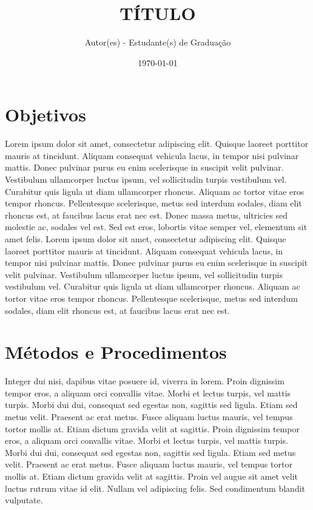 \documentclass[twocolumn]{article}
\title{TÍTULO}
\author{Autor(es) - Estudante(s) de Graduação}
\date{\today}
\begin{document}
\maketitle\thispagestyle{headings}

\section*{Objetivos}

Lorem ipsum dolor sit amet, consectetur adipiscing elit. Quisque laoreet porttitor mauris at tincidunt. Aliquam consequat vehicula lacus, in tempor nisi pulvinar mattis. Donec pulvinar purus eu enim scelerisque in suscipit velit pulvinar. Vestibulum ullamcorper luctus ipsum, vel sollicitudin turpis vestibulum vel. Curabitur quis ligula ut diam ullamcorper rhoncus. Aliquam ac tortor vitae eros tempor rhoncus. Pellentesque scelerisque, metus sed interdum sodales, diam elit rhoncus est, at faucibus lacus erat nec est. Donec massa metus, ultricies sed molestie ac, sodales vel est. Sed est eros, lobortis vitae semper vel, elementum sit amet felis. Lorem ipsum dolor sit amet, consectetur adipiscing elit. Quisque laoreet porttitor mauris at tincidunt. Aliquam consequat vehicula lacus, in tempor nisi pulvinar mattis. Donec pulvinar purus eu enim scelerisque in suscipit velit pulvinar. Vestibulum ullamcorper luctus ipsum, vel sollicitudin turpis vestibulum vel. Curabitur quis ligula ut diam ullamcorper rhoncus. Aliquam ac tortor vitae eros tempor rhoncus. Pellentesque scelerisque, metus sed interdum sodales, diam elit rhoncus est, at faucibus lacus erat nec est. 

\section*{Métodos e Procedimentos}

Integer dui nisi, dapibus vitae posuere id, viverra in lorem. Proin dignissim tempor eros, a aliquam orci convallis vitae. Morbi et lectus turpis, vel mattis turpis. Morbi dui dui, consequat sed egestas non, sagittis sed ligula. Etiam sed metus velit. Praesent ac erat metus. Fusce aliquam luctus mauris, vel tempus tortor mollis at. Etiam dictum gravida velit at sagittis. 
Proin dignissim tempor eros, a aliquam orci convallis vitae. Morbi et lectus turpis, vel mattis turpis. Morbi dui dui, consequat sed egestas non, sagittis sed ligula. Etiam sed metus velit. Praesent ac erat metus. Fusce aliquam luctus mauris, vel tempus tortor mollis at. Etiam dictum gravida velit at sagittis. Proin vel augue sit amet velit luctus rutrum vitae id elit. Nullam vel adipiscing felis. Sed condimentum blandit vulputate.
\end{document}
